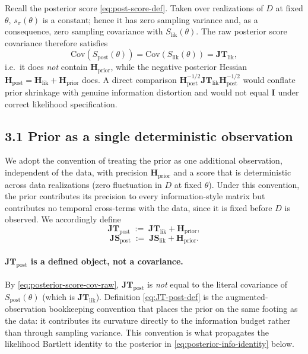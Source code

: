 \documentclass[11pt]{article}
\begin{document}
Recall the posterior score \eqref{eq:post-score-def}. Taken over realizations of $D$ at fixed $\theta$, $s_\pi(\theta)$ is a constant; hence it has zero sampling variance and, as a consequence, zero sampling covariance with $S_{\mathrm{lik}}(\theta)$. The raw posterior score covariance therefore satisfies
\begin{equation}
\mathrm{Cov}\!\left(S_{\mathrm{post}}(\theta)\right)
=
\mathrm{Cov}\!\left(S_{\mathrm{lik}}(\theta)\right)
=
\mathbf{JT}_{\mathrm{lik}},
\label{eq:posterior-score-cov-raw}
\end{equation}
i.e.\ it does \emph{not} contain $\mathbf H_{\mathrm{prior}}$, while the negative posterior Hessian $\mathbf H_{\mathrm{post}} = \mathbf H_{\mathrm{lik}} + \mathbf H_{\mathrm{prior}}$ does. A direct comparison $\mathbf H_{\mathrm{post}}^{-1/2} \mathbf{JT}_{\mathrm{lik}} \mathbf H_{\mathrm{post}}^{-1/2}$ would conflate prior shrinkage with genuine information distortion and would not equal $\mathbf I$ under correct likelihood specification.

\subsection*{3.1 Prior as a single deterministic observation}

We adopt the convention of treating the prior as one additional observation, independent of the data, with precision $\mathbf H_{\mathrm{prior}}$ and a score that is deterministic across data realizations (zero fluctuation in $D$ at fixed $\theta$). Under this convention, the prior contributes its precision to every information-style matrix but contributes no temporal cross-terms with the data, since it is fixed before $D$ is observed. We accordingly define
\begin{equation}
\mathbf{JT}_{\mathrm{post}}
\;:=\;
\mathbf{JT}_{\mathrm{lik}} + \mathbf H_{\mathrm{prior}},
\label{eq:JT-post-def}
\end{equation}
\begin{equation}
\mathbf{JS}_{\mathrm{post}}
\;:=\;
\mathbf{JS}_{\mathrm{lik}} + \mathbf H_{\mathrm{prior}}.
\label{eq:JS-post-def}
\end{equation}

\paragraph{$\mathbf{JT}_{\mathrm{post}}$ is a defined object, not a covariance.}
By \eqref{eq:posterior-score-cov-raw}, $\mathbf{JT}_{\mathrm{post}}$ is \emph{not} equal to the literal covariance of $S_{\mathrm{post}}(\theta)$ (which is $\mathbf{JT}_{\mathrm{lik}}$). Definition \eqref{eq:JT-post-def} is the augmented-observation bookkeeping convention that places the prior on the same footing as the data: it contributes its curvature directly to the information budget rather than through sampling variance. This convention is what propagates the likelihood Bartlett identity to the posterior in \eqref{eq:posterior-info-identity} below.
\end{document}
